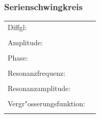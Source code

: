 \subsubsection{Serienschwingkreis  }
\renewcommand{\arraystretch}{2}
\begin{tabular}{|p{4cm}|p{14cm}|}
\hline
Diffgl: &
\begin{minipage}[]{14cm}
\vspace{0.2cm}
$L\ddot{I}+R_S\dot{I}+\dfrac{1}{C}\,I=\omega\,U_0\,\sin(\omega t +
\dfrac{\pi}{2})$ \qquad $I=I_0\,e^{-\delta t}\,\sin(\omega_d t+\varphi)$\\
\end{minipage}\\
\hline
Amplitude: &
\begin{minipage}[]{14cm}
\vspace{0.2cm}
$I_0=\dfrac{\omega\,U_0}{L\sqrt{(\omega_0^{\,2}-\omega^2)^2+(2D\,\omega_0\,\omega)^2}}$\\
\end{minipage}\\
\hline
Phase: &
\begin{minipage}[]{14cm}
\vspace{0.2cm}
$\varphi=\arctan{\dfrac{2D\,\omega_0\,\omega}{\omega_0^{\,2}-\omega^2}}-\dfrac{\pi}{2}$\\
\end{minipage}\\
\hline
Resonanzfrequenz: &
\begin{minipage}[]{14cm}
\vspace{0.2cm}
$\omega_r=\omega_0=\dfrac{1}{\sqrt{LC}}$ \qquad
$\omega_d=\omega_0\sqrt{1-D^2}=\dfrac{1}{\sqrt{LC}}\,\sqrt{1-\dfrac{R^2C}{4L}}$\\
\end{minipage}\\
\hline
Resonanzamplitude: &
\begin{minipage}[]{14cm}
\vspace{0.2cm}
$I_{0_r}=\dfrac{U_0}{R_S}$\\
\end{minipage}\\
\hline
Vergr"osserungsfunktion: &
\begin{minipage}[]{14cm}
\vspace{0.2cm}
$V(\eta)=\dfrac{\eta^2}{\sqrt{(1-\eta^2)^2+(2D\,\eta)^2}}$\qquad Max:
$V_m=\dfrac{1}{2D\sqrt{1-D^2}}$\\
\end{minipage}\\

\end{tabular}
